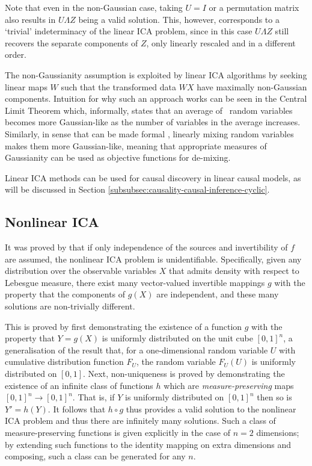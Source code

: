 Note that even in the non-Gaussian case, taking $U=I$ or a permutation matrix also results in $U\Lambda Z$ being a valid solution. 
This, however, corresponds to a `trivial' indeterminacy of the linear ICA problem, since in this case $U\Lambda Z$ still recovers the separate components of $Z$, only linearly rescaled and in a different order.

The non-Gaussianity assumption is exploited by linear ICA algorithms by seeking linear maps $W$ such that the transformed data ${W}X$ have maximally non-Gaussian components.
Intuition for why such an approach works can be seen in the Central Limit Theorem which, informally, states that an average of \iid~random variables becomes more Gaussian-like as the number of variables in the average increases. 
Similarly, in sense that can be made formal \citep{hyvarinen2000independent}, linearly mixing random variables makes them more Gaussian-like, meaning that appropriate measures of Gaussianity can be used as objective functions for de-mixing.

Linear ICA methods can be used for causal discovery in linear causal models, as will be discussed in Section \ref{subsubsec:causality-causal-inference-cyclic}.





\subsection{Nonlinear ICA}\label{subsec:ica-literature-nonlinear-ica}
 
It was proved by \cite{hyvarinen1999nonlinear} that if only independence of the sources and invertibility of $f$ are assumed, the nonlinear ICA problem is unidentifiable.
Specifically, given any distribution over the observable variables $X$ that admits density with respect to Lebesgue measure, there exist many vector-valued invertible mappings $g$ with the property that the components of $g(X)$ are independent, and these many solutions are non-trivially different.

This is proved by first demonstrating the existence of a function $g$ with the property that $Y=g(X)$ is uniformly distributed on the unit cube $[0, 1]^n$,
a generalisation of the result that, for a one-dimensional random variable $U$  with cumulative distribution function $F_U$, the random variable $F_U(U)$ is uniformly distributed on $[0,1]$.
Next, non-uniqueness is proved by demonstrating the existence of an infinite class of functions $h$ which are \emph{measure-preserving} maps $[0,1]^n \to [0,1]^n$. 
That is, if $Y$ is uniformly distributed on $[0,1]^n$ then so is  $Y' = {h}({Y})$.
It follows that ${h}\circ {g}$ thus provides a valid solution to the nonlinear ICA problem and thus there are infinitely many solutions. 
Such a class of measure-preserving functions is given explicitly in the case of $n=2$ dimensions; by extending such functions to the identity mapping on extra dimensions and composing, such a class can be generated for any $n$.

